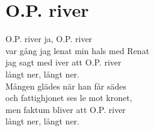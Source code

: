 \section{O.P. river}
O.P. river ja, O.P. river\\
var gång jag lenat min hals med Renat\\
jag sagt med iver att O.P. river\\
långt ner, långt ner.\\

Mången glädes när han får sädes\\
och fattighjonet ses le mot kronet,\\
men faktum bliver att O.P. river\\
långt ner, långt ner.\\